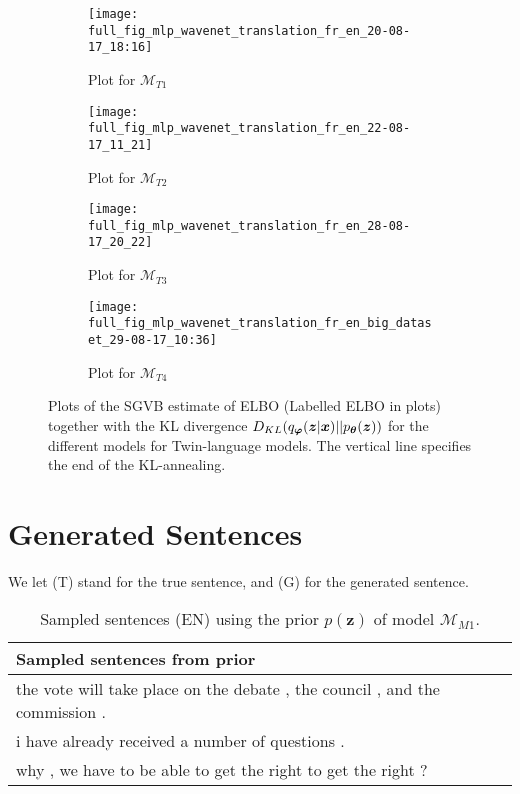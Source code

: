\begin{figure}[!htbp]
  \centering
  \begin{subfigure}[b]{0.5\textwidth}
    \centering
    \texttt{[image: full\_fig\_mlp\_wavenet\_translation\_fr\_en\_20-08-17\_18:16]}
    \caption{Plot for $\mathcal{M}_{T1}$}
    \label{fig:translate_M1}
  \end{subfigure}%
  \begin{subfigure}[b]{0.5\textwidth}
    \centering
    \texttt{[image: full\_fig\_mlp\_wavenet\_translation\_fr\_en\_22-08-17\_11\_21]}
    \caption{Plot for $\mathcal{M}_{T2}$}
    \label{fig:translate_M2}
  \end{subfigure}
  \begin{subfigure}[b]{0.5\textwidth}
    \centering
    \texttt{[image: full\_fig\_mlp\_wavenet\_translation\_fr\_en\_28-08-17\_20\_22]}
    \caption{Plot for $\mathcal{M}_{T3}$}
    \label{fig:translate_M3}
  \end{subfigure}%
  \begin{subfigure}[b]{0.5\textwidth}
    \centering
    \texttt{[image: full\_fig\_mlp\_wavenet\_translation\_fr\_en\_big\_dataset\_29-08-17\_10:36]}
    \caption{Plot for $\mathcal{M}_{T4}$}
    \label{fig:translate_M4}
  \end{subfigure}
  \caption{Plots of the SGVB estimate of ELBO (Labelled ELBO in plots)
      together with the KL divergence $D_{KL}(q_{\bm{\varphi}}(\bm{z} |
        \bm{x}) || p_{\bm{\theta}}(\bm{z}))$ for the different models for
      Twin-language models. The
      vertical line specifies the end of the KL-annealing.}
\end{figure}

\FloatBarrier

\section{Generated Sentences}

We let (T) stand for the true sentence, and (G) for the generated sentence.

\begin{table}
  \centering
  \begin{tabular}{|L{14cm}|} 
    \hline
    Sampled sentences from prior\\ [0.5ex] 
    \hline\hline
    the vote will take place on the debate , the council , and the commission .\\
    \hline
    i have already received a number of questions .\\
    \hline
    why , we have to be able to get the right to get the right ?\\
    \hline
  \end{tabular}
  \caption{Sampled sentences (EN) using the prior $p(\bm{z})$ of model $\mathcal{M}_{M1}$.}
\end{table}

